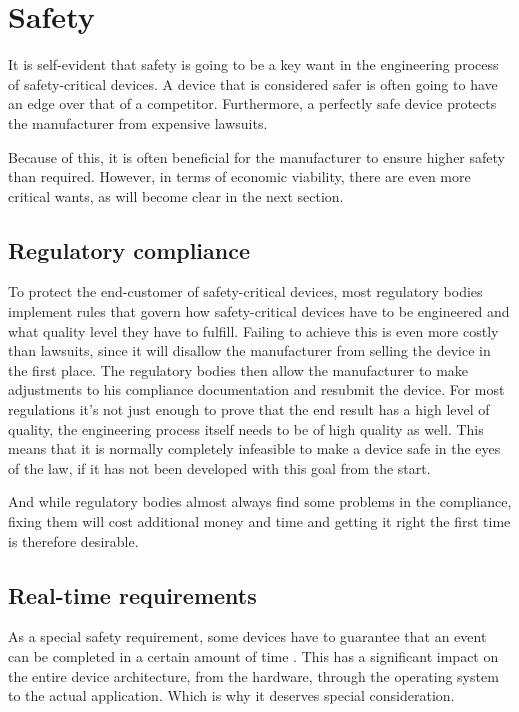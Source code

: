\section{Safety}
It is self-evident that safety is going to be a key want in the engineering process of safety-critical devices. A device that is considered safer is often going to have an edge over that of a competitor. Furthermore, a perfectly safe device protects the manufacturer from expensive lawsuits.

Because of this, it is often beneficial for the manufacturer to ensure higher safety than required. However, in terms of economic viability, there are even more critical wants, as will become clear in the next section.

\subsection{Regulatory compliance}
To protect the end-customer of safety-critical devices, most regulatory bodies implement rules that govern how safety-critical devices have to be engineered and what quality level they have to fulfill.
Failing to achieve this is even more costly than lawsuits, since it will disallow the manufacturer from selling the device in the first place. The regulatory bodies then allow the manufacturer to make adjustments to his compliance documentation and resubmit the device. For most regulations it’s not just enough to prove that the end result has a high level of quality, the engineering process itself needs to be of high quality as well. This means that it is normally completely infeasible to make a device safe in the eyes of the law, if it has not been developed with this goal from the start. 

And while regulatory bodies almost always find some problems in the compliance, fixing them will cost additional money and time and getting it right the first time is therefore desirable.

\subsection{Real-time requirements}
As a special safety requirement, some devices have to guarantee that an event can be completed in a certain amount of time \cite{shin1994real}. This has a significant impact on the entire device architecture, from the hardware, through the operating system to the actual application. Which is why it deserves special consideration.

